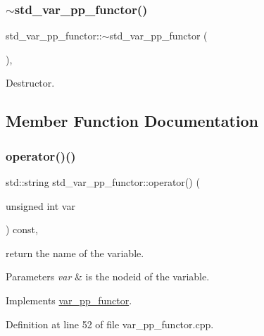 \subsubsection{\texorpdfstring{$\sim$std\+\_\+var\+\_\+pp\+\_\+functor()}{~std\_var\_pp\_functor()}}
{\footnotesize\ttfamily std\+\_\+var\+\_\+pp\+\_\+functor\+::$\sim$std\+\_\+var\+\_\+pp\+\_\+functor (\begin{DoxyParamCaption}{ }\end{DoxyParamCaption})\hspace{0.3cm}{\ttfamily [override]}, {\ttfamily [default]}}



Destructor. 



\subsection{Member Function Documentation}
\mbox{\label{structstd__var__pp__functor_a0fe9aed55084be9ea80846ad5ceee014}} 
\subsubsection{\texorpdfstring{operator()()}{operator()()}}
{\footnotesize\ttfamily std\+::string std\+\_\+var\+\_\+pp\+\_\+functor\+::operator() (\begin{DoxyParamCaption}\item[{unsigned int}]{var }\end{DoxyParamCaption}) const\hspace{0.3cm}{\ttfamily [override]}, {\ttfamily [virtual]}}



return the name of the variable. 


\begin{DoxyParams}{Parameters}
{\em var} & is the nodeid of the variable. \\
\hline
\end{DoxyParams}


Implements \hyperlink{structvar__pp__functor_a6bcbd4e1551ac2584638ef70ecc6f361}{var\+\_\+pp\+\_\+functor}.



Definition at line 52 of file var\+\_\+pp\+\_\+functor.\+cpp.



